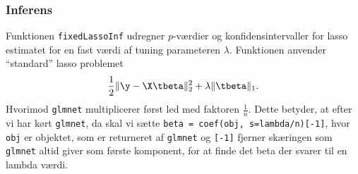 \subsubsection{Inferens} \label{subsubsec:inferens}
Funktionen \texttt{fixedLassoInf} udregner \(p\)-værdier og konfidensintervaller for lasso estimatet for en fast værdi af tuning parameteren \(\lambda\).
Funktionen anvender ``standard'' lasso problemet
\begin{align*}
\frac{1}{2} \Vert \y - \X \tbeta \Vert_2^2 + \lambda \Vert \tbeta \Vert_1.
\end{align*}
Hvorimod \texttt{glmnet} multiplicerer først led med faktoren \(\frac{1}{n}\).
Dette betyder, at efter vi har kørt \texttt{glmnet}, da skal vi sætte \texttt{beta = coef(obj, s=lambda/n)[-1]}, hvor \texttt{obj} er objektet, som er returneret af \texttt{glmnet} og \texttt{[-1]} fjerner skæringen som \texttt{glmnet} altid giver som første komponent, for at finde det beta der svarer til en lambda værdi.
%
%




